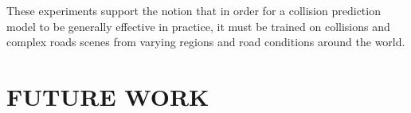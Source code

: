 \documentclass[letterpaper, 10 pt, conference]{ieeeconf}
\newcommand{\todo}[1]{{\color{red}#1}}
\begin{document}
These experiments support the notion that in order for a collision prediction model to be generally effective in practice, it must be trained on collisions and complex roads scenes from varying regions and road conditions around the world.


\section{FUTURE WORK}
\end{document}
